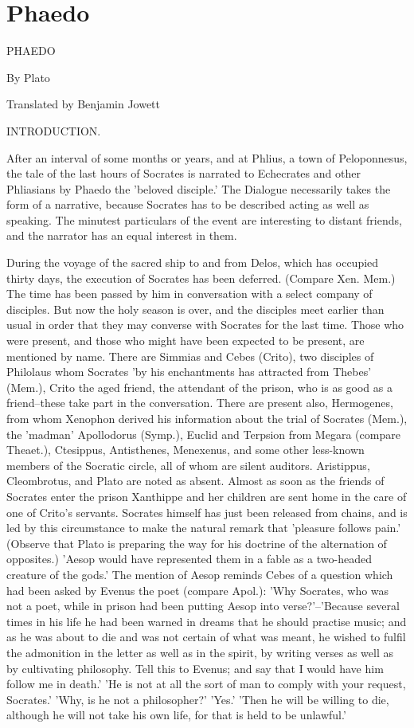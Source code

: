 \chapter{Phaedo} %
\label{cha:phaedo}
PHAEDO

By Plato


Translated by Benjamin Jowett




INTRODUCTION.

After an interval of some months or years, and at Phlius, a town of
Peloponnesus, the tale of the last hours of Socrates is narrated to
Echecrates and other Phliasians by Phaedo the 'beloved disciple.' The
Dialogue necessarily takes the form of a narrative, because Socrates has
to be described acting as well as speaking. The minutest particulars of
the event are interesting to distant friends, and the narrator has an
equal interest in them.

During the voyage of the sacred ship to and from Delos, which has
occupied thirty days, the execution of Socrates has been deferred.
(Compare Xen. Mem.) The time has been passed by him in conversation with
a select company of disciples. But now the holy season is over, and the
disciples meet earlier than usual in order that they may converse with
Socrates for the last time. Those who were present, and those who might
have been expected to be present, are mentioned by name. There are
Simmias and Cebes (Crito), two disciples of Philolaus whom Socrates
'by his enchantments has attracted from Thebes' (Mem.), Crito the aged
friend, the attendant of the prison, who is as good as a friend--these
take part in the conversation. There are present also, Hermogenes,
from whom Xenophon derived his information about the trial of Socrates
(Mem.), the 'madman' Apollodorus (Symp.), Euclid and Terpsion from
Megara (compare Theaet.), Ctesippus, Antisthenes, Menexenus, and some
other less-known members of the Socratic circle, all of whom are silent
auditors. Aristippus, Cleombrotus, and Plato are noted as absent. Almost
as soon as the friends of Socrates enter the prison Xanthippe and her
children are sent home in the care of one of Crito's servants.
Socrates himself has just been released from chains, and is led by this
circumstance to make the natural remark that 'pleasure follows pain.'
(Observe that Plato is preparing the way for his doctrine of the
alternation of opposites.) 'Aesop would have represented them in a fable
as a two-headed creature of the gods.' The mention of Aesop reminds
Cebes of a question which had been asked by Evenus the poet (compare
Apol.): 'Why Socrates, who was not a poet, while in prison had been
putting Aesop into verse?'--'Because several times in his life he had
been warned in dreams that he should practise music; and as he was about
to die and was not certain of what was meant, he wished to fulfil the
admonition in the letter as well as in the spirit, by writing verses as
well as by cultivating philosophy. Tell this to Evenus; and say that I
would have him follow me in death.' 'He is not at all the sort of man
to comply with your request, Socrates.' 'Why, is he not a philosopher?'
'Yes.' 'Then he will be willing to die, although he will not take his
own life, for that is held to be unlawful.'

